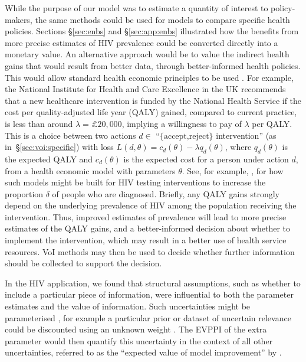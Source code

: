 \documentclass[12pt]{article}\usepackage[]{graphicx}\usepackage[]{color}
\begin{document}
While the purpose of our model was to estimate a quantity of interest to policy-makers, the same methods could be used for models to compare specific health policies.   Sections \S\ref{sec:enbs} and \S\ref{sec:app:enbs} illustrated how the benefits from more precise estimates of HIV prevalence could be converted directly into a monetary value.   An alternative approach would be to value the indirect health gains that would result from better data, through better-informed health policies.  This would allow standard health economic principles to be used \citep[see, e.g.][]{decision:modelling}.  
 For example, the National Institute for Health and Care Excellence in the UK recommends that a new healthcare intervention is funded by the National Health Service if the cost per quality-adjusted life year (QALY) gained, compared to current practice, is less than around $\lambda = \pounds 20,000$, implying a willingness to pay of $\lambda$ per QALY.    This is a choice between two actions $d \in $ ``$\{\mbox{accept,reject}\}$ intervention'' (as in~\S\ref{sec:voi:specific}) with loss $L(d,\theta) = c_d(\theta) - \lambda q_d(\theta)$, where $q_d(\theta)$ is the expected QALY and $c_d(\theta)$ is the expected cost for a person under action $d$, from a health economic model with parameters $\theta$.  See, for example, \citet{nice:hiv:testing:evidence,baggaley2017cost}, for how such models might be built for HIV testing interventions to increase the proportion $\delta$ of people who are diagnosed.     Briefly, any QALY gains strongly depend on the underlying prevalence of HIV among the population receiving the intervention.   Thus, improved estimates of prevalence will lead to more precise estimates of the QALY gains, and a better-informed decision about whether to implement the intervention, which may result in a better use of health service resources.   VoI methods may then be used to decide whether further information should be collected to support the decision. 

In the HIV application, we found that structural assumptions, such as whether to include a particular piece of information, were influential to both the parameter estimates and the value of information.   Such uncertainties might be parameterised \citep[see, e.g.][]{strong:discrepancy:jrssc}, for example a particular prior or dataset of uncertain relevance could be discounted using an unknown weight \citep[e.g.][]{neuenschwander2009note}.  The EVPPI of the extra parameter would then quantify this uncertainty in the context of all other uncertainties, referred to as the ``expected value of model improvement'' by \citet{strong2014model}. 
\end{document}
